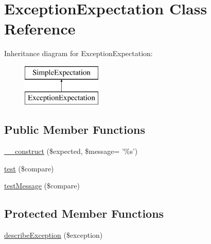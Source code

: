 \hypertarget{class_exception_expectation}{
\section{ExceptionExpectation Class Reference}
\label{class_exception_expectation}
}
Inheritance diagram for ExceptionExpectation:\begin{figure}[H]
\begin{center}
\leavevmode
\includegraphics[height=2.000000cm]{class_exception_expectation}
\end{center}
\end{figure}
\subsection*{Public Member Functions}
\begin{DoxyCompactItemize}
\item 
\hyperlink{class_exception_expectation_a98ec83b769c415a3d29c800665a07c8f}{\_\-\_\-construct} (\$expected, \$message= '\%s')
\item 
\hyperlink{class_exception_expectation_a302c92bdfd0dc2bb308e8f85628dbc2b}{test} (\$compare)
\item 
\hyperlink{class_exception_expectation_afe072b85351847a113ee868c6548fbc5}{testMessage} (\$compare)
\end{DoxyCompactItemize}
\subsection*{Protected Member Functions}
\begin{DoxyCompactItemize}
\item 
\hyperlink{class_exception_expectation_a4f7a76d97a172afd6d3c60ce42ab01f6}{describeException} (\$exception)
\end{DoxyCompactItemize}


